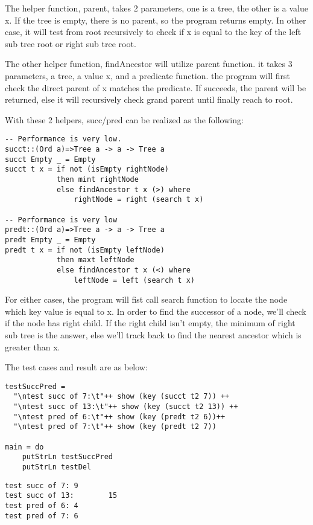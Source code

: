 \documentclass{article}
\begin{document}
The helper function, parent, takes 2 parameters, one is a tree, the other
is a value x. If the tree is empty, there is no parent, so the program returns
empty. In other case, it will test from root recursively to check if x is equal to
the key of the left sub tree root or right sub tree root.

The other helper function, findAncestor will utilize parent function. it takes 3
parameters, a tree, a value x, and a predicate function. the program will first 
check the direct parent of x matches the predicate. If succeeds, the parent will
be returned, else it will recursively check grand parent until finally reach to root.

With these 2 helpers, succ/pred can be realized as the following:
\begin{lstlisting}
-- Performance is very low.
succt::(Ord a)=>Tree a -> a -> Tree a
succt Empty _ = Empty
succt t x = if not (isEmpty rightNode)
            then mint rightNode
            else findAncestor t x (>) where
                rightNode = right (search t x)

-- Performance is very low
predt::(Ord a)=>Tree a -> a -> Tree a
predt Empty _ = Empty
predt t x = if not (isEmpty leftNode)
            then maxt leftNode
            else findAncestor t x (<) where
                leftNode = left (search t x)
\end{lstlisting}

For either cases, the program will fist call search function to locate the node
which key value is equal to x. In order to find the successor of a node, we'll 
check if the node has right child. If the right child isn't empty, the minimum 
of right sub tree is the answer, else we'll track back to find the nearest 
ancestor which is greater than x.

The test cases and result are as below:
\begin{lstlisting}
testSuccPred = 
  "\ntest succ of 7:\t"++ show (key (succt t2 7)) ++
  "\ntest succ of 13:\t"++ show (key (succt t2 13)) ++
  "\ntest pred of 6:\t"++ show (key (predt t2 6))++
  "\ntest pred of 7:\t"++ show (key (predt t2 7))

main = do
    putStrLn testSuccPred
    putStrLn testDel
\end{lstlisting}

\begin{verbatim}
test succ of 7: 9
test succ of 13:        15
test pred of 6: 4
test pred of 7: 6
\end{verbatim}
\end{document}
